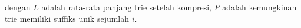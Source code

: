     dengan $L$ adalah rata-rata panjang trie setelah kompresi, $P$ adalah kemungkinan trie memiliki suffiks unik sejumlah $i$. 









